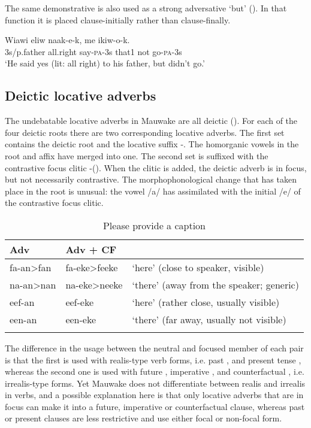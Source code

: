 The same demonstrative is also used as a strong adversative `but'  (). In that function it is placed clause-initially rather than clause-finally.

\ea%
\label{ex:3:x690}
\gll Wiawi eliw naak-e-k,  me ikiw-o-k. \\
3s/p.father all.right say-\textsc{pa}-3s that1 not go-\textsc{pa}-3s\\
\glt`He said yes (lit: all right) to his father, but didn't go.'
\z

\subsection{Deictic locative adverbs} \label{sec:3:y:x}
{}
The undebatable locative adverbs in Mauwake are all deictic (). For each of the four deictic roots there are two corresponding locative adverbs. The first set contains the deictic root and the locative suffix -. The homorganic vowels in the root and affix have merged into one. The second set is suffixed with the contrastive focus clitic -(). When the clitic is added, the deictic adverb is in focus, but not necessarily contrastive. The morphophonological change that has taken place in the root is unusual: the vowel /a/ has assimilated with the initial /e/ of the contrastive focus clitic. 

\begin{table}
\caption{Please provide a caption}
\label{} 
\begin{tabular}{lll}
\mytoprule
Adv &Adv + CF&\\
\midrule
fa-an{\textgreater}fan &fa-eke{\textgreater}feeke &`here' (close to speaker, visible) \\
na-an{\textgreater}nan &na-eke{\textgreater}neeke &`there' (away from the speaker; generic)\\
eef-an &eef-eke &`here' (rather close, usually visible)\\
een-an &een-eke &`there' (far away, usually not visible)\\
\mybottomrule
\end{tabular}
\end{table}


The difference in the usage between the neutral and focused member of each pair is that the first is  used with realis-type verb forms, i.e. past ,  and present tense , whereas the second one is  used with future , imperative , and counterfactual , i.e. irrealis-type forms. Yet Mauwake does not differentiate between realis and irrealis in verbs, and a possible explanation here is that only locative adverbs that are in focus can make it into a future, imperative or counterfactual clause, whereas past or present clauses are less restrictive and use either focal or non-focal form. 

